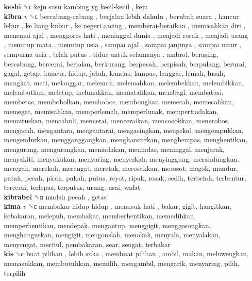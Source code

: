 \textbf{keshi} ␝ϲ   keju susu kambing yg kecil-kecil , keju  \\
\textbf{kibra} \emph{v}  ␝ϲ   bercabang-cabang ,  berjalan lebih dahulu ,  berubah suara ,  hancur lebur ,  ke liang kubur ,  ke negeri cacing ,  memberai-beraikan ,  memisahkan diri ,  menemui ajal ,  menggores hati ,  meninggal dunia ,  menjadi rosak ,  menjadi usang ,  menutup mata ,  menutup usia ,  sampai ajal ,  sampai janjinya ,  sampai umur ,  sempurna usia ,  telah putus ,  tidur untuk selamanya , ambrol, berasing, bercabang, bercerai, berjalan, berkurang, berpecah, berpisah, berpulang, berurai, gagal, getap, hancur, hidup, jatuh, kandas, lampus, langgar, lemah, lusuh, mangkat, mati, melanggar, melemah, melemahkan, melembekkan, melembikkan, melembutkan, meletup, melunakkan, mematahkan, membagi, membatasi, membetas, membobolkan, membobos, membongkar, memecah, memecahkan, memegat, memisahkan, memperlemah, memperlunak, mempertiadakan, memutuskan, mencabuli, mencerai, menceraikan, mencocokkan, menerobos, mengacah, mengantara, mengantarai, mengasingkan, mengekol, mengempukkan, mengendurkan, mengganggangkan, menghancurkan, menghempas, menghentikan, mengurang, mengurangkan, meniadakan, menindas, meninggal, menjarak, menyakiti, menyakukan, menyaring, menyerkah, menyinggung, merandungkan, meregah, merekah, merengat, meretak, merosakkan, merosot, mogok, mundur, patah, pecah, pisah, pukah, putus, reyot, ripuk, rosak, sedih, terbelah, terbentur, tercerai, terlepas, terputus, urung, usai, wafat  \\
\textbf{kibrabel} ␝α   mudah pecah , getas  \\
\textbf{kima} \emph{v}  ␝ϲ   membakar hidup-hidup ,  menusuk hati , bakar, gigit, hangitkan, kebakaran, melepuh, membakar, memberhentikan, memedihkan, memperhentikan, mendepak, mengantup, menggigit, menggosongkan, menghanguskan, mengigit, mengonslah, menokak, menyala, menyalakan, menyengat, meritul, pembakaran, sear, sengat, terbakar  \\
\textbf{kis} ␝ϲ   buat pilihan ,  lebih suka ,  membuat pilihan , ambil, makan, meluwengkan, memasukkan, membutuhkan, memilih, mengambil, mengarik, menyaring, pilih, terpilih  \\
